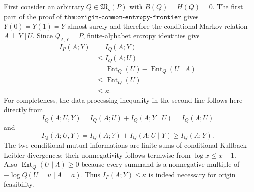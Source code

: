 First consider an arbitrary \(Q\in\mathfrak M_\kappa(P)\) with \(B(Q)=H(Q)=0\).  The first part of the proof of \(\texttt{thm:origin-common-entropy-frontier}\) gives \(Y(0)=Y(1)=Y\) almost surely and therefore the conditional Markov relation \(A\perp Y\mid U\).  Since \(Q_{A,Y}=P\), finite-alphabet entropy identities give
\[
\begin{aligned}
 I_P(A;Y)&=I_Q(A;Y)\\
 &\leq I_Q(A;U)\\
 &=\operatorname{Ent}_Q(U)-\operatorname{Ent}_Q(U\mid A)\\
 &\leq\operatorname{Ent}_Q(U)\\
 &\leq\kappa.
\end{aligned}
\]
For completeness, the data-processing inequality in the second line follows here directly from
\[
 I_Q(A;U,Y)=I_Q(A;U)+I_Q(A;Y\mid U)=I_Q(A;U)
\]
and
\[
 I_Q(A;U,Y)=I_Q(A;Y)+I_Q(A;U\mid Y)\geq I_Q(A;Y).
\]
The two conditional mutual informations are finite sums of conditional Kullback--Leibler divergences; their nonnegativity follows termwise from \(\log x\leq x-1\).  Also \(\operatorname{Ent}_Q(U\mid A)\geq0\) because every summand is a nonnegative multiple of \(-\log Q(U=u\mid A=a)\).  Thus \(I_P(A;Y)\leq\kappa\) is indeed necessary for origin feasibility.

